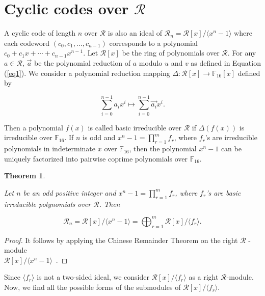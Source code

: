 \documentclass{amsart}
\newtheorem{theorem}{Theorem}[section]
\theoremstyle{definition}
\theoremstyle{remark}
\numberwithin{equation}{section}
\begin{document}
   \section{Cyclic codes over $\mathcal{R}$ }
	  A cyclic code of length $n$ over $\mathcal{R}$ is also an ideal of $\mathcal{R}_n=\mathcal{R}[x]/ \langle x^n -1 \rangle$ where each codeword $(c_0,c_1,\dots,c_{n-1})$ corresponds to a polynomial $c_0 +c_1x+\cdots+c_{n-1}x^{n-1}$. Let $\mathcal{R}[x]$ be the ring of polynomials over $\mathcal{R}$. For any  $a\in \mathcal{R}$,  $\overrightarrow{a}$ be the polynomial reduction of $a$ modulo $u$ and $v$ as defined in Equation (\ref{eq1}). We consider a polynomial reduction mapping $\Delta : \mathcal{R}[x] \rightarrow \mathbb F_{16}[x]$ defined by
    
    $$\sum_{i=0}^{n-1}a_ix^i \mapsto \sum_{i=0}^{n-1}\overrightarrow{a_i}x^i.$$
    
    Then a polynomial $f(x)$ is called basic irreducible over $\mathcal{R}$ if $\Delta(f(x))$  is irreducible over $\mathbb F _{16}$. If $n$ is odd and $x^n - 1 =\prod_{r=1}^{m} f_r$, where $f_ r$'s are irreducible polynomials in indeterminate $x$ over $\mathbb F _{16}$, then the  polynomial $x^n-1$ can be uniquely factorized into pairwise coprime polynomials over $\mathbb F _{16}$.
    
    \begin{theorem}\label{th1}
    
    Let $n$ be an odd positive integer and $x^n - 1 =\prod_{r=1}^{m} f_r$, where $f_ r$'s are basic irreducible polynomials over $\mathcal{R}$. Then
    
    $$\mathcal{R}_n=\mathcal{R}[x]/ \langle x^n -1 \rangle=\displaystyle\bigoplus_{r=1}^{m} \mathcal{R}[x]/ \langle f_r\rangle.$$
    
    \end{theorem}
    \begin{proof}
    
    It follows by applying the Chinese Remainder Theorem on the right $\mathcal{R}$ - module \\ $\mathcal{R}[x]/ \langle x^n -1 \rangle $~\cite{F,R}.
    
     \end{proof}
    
    Since $ \langle f_r\rangle$ is not a two-sided ideal, we consider $\mathcal{R}[x]/ \langle f_r\rangle$ as a right $\mathcal{R}$-module. Now, we find all the possible forms of the submodules of $\mathcal{R}[x]/ \langle f_r\rangle$.
\end{document}
